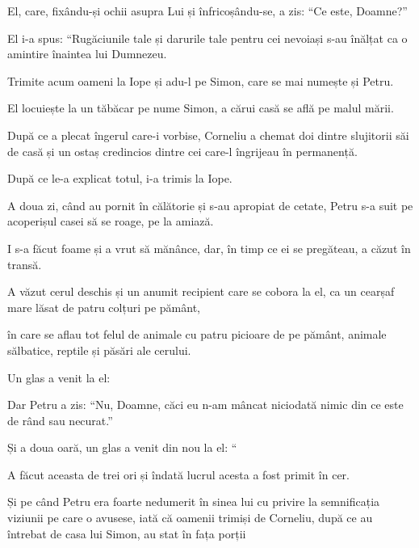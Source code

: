 {\par }{\PP {}El, care, fixându-și ochii asupra Lui și înfricoșându-se, a zis: “Ce este, Doamne?”

\par }{\PP El i-a spus: “Rugăciunile tale și darurile tale pentru cei nevoiași s-au înălțat ca o amintire înaintea lui Dumnezeu.

Trimite acum oameni la Iope și adu-l pe Simon, care se mai numește și Petru.

El locuiește la un tăbăcar pe nume Simon, a cărui casă se află pe malul mării.


\par }{\PP {}După ce a plecat îngerul care-i vorbise, Corneliu a chemat doi dintre slujitorii săi de casă și un ostaș credincios dintre cei care-l îngrijeau în permanență.

După ce le-a explicat totul, i-a trimis la Iope.


\par }{\PP {}A doua zi, când au pornit în călătorie și s-au apropiat de cetate, Petru s-a suit pe acoperișul casei să se roage, pe la amiază.

I s-a făcut foame și a vrut să mănânce, dar, în timp ce ei se pregăteau, a căzut în transă.

A văzut cerul deschis și un anumit recipient care se cobora la el, ca un cearșaf mare lăsat de patru colțuri pe pământ,

în care se aflau tot felul de animale cu patru picioare de pe pământ, animale sălbatice, reptile și păsări ale cerului.

Un glas a venit la el:
{}


\par }{\PP {}Dar Petru a zis: “Nu, Doamne, căci eu n-am mâncat niciodată nimic din ce este de rând sau necurat.”


\par }{\PP {}Și a doua oară, un glas a venit din nou la el: “{}

A făcut aceasta de trei ori și îndată lucrul acesta a fost primit în cer.


\par }{\PP {}Și pe când Petru era foarte nedumerit în sinea lui cu privire la semnificația viziunii pe care o avusese, iată că oamenii trimiși de Corneliu, după ce au întrebat de casa lui Simon, au stat în fața porții

}
